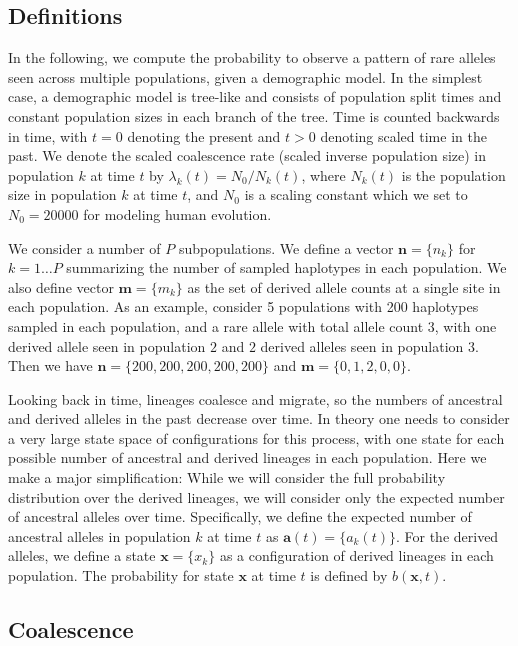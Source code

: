 \documentclass[a4paper]{article}
\begin{document}
\subsection*{Definitions}
In the following, we compute the probability to observe a pattern of rare alleles seen across multiple populations, given a demographic model. In the simplest case, a demographic model is tree-like and consists of population split times and constant population sizes in each branch of the tree. Time is counted backwards in time, with $t=0$ denoting the present and $t>0$ denoting scaled time in the past. We denote the scaled coalescence rate (scaled inverse population size) in population $k$ at time $t$ by $\lambda_k(t)=N_0/N_k(t)$, where $N_k(t)$ is the population size in population $k$ at time $t$, and $N_0$ is a scaling constant which we set to $N_0=20000$ for modeling human evolution.

We consider a number of $P$ subpopulations. We define a vector $\mathbf{n}=\{n_k\}$ for $k=1\ldots P$ summarizing the number of sampled haplotypes in each population. We also define vector $\mathbf{m}=\{m_k\}$ as the set of derived allele counts at a single site in each population. As an example, consider 5 populations with 200 haplotypes sampled in each population, and a rare allele with total allele count $3$, with one derived allele seen in population $2$ and $2$ derived alleles seen in population $3$. Then we have $\mathbf{n}=\{200,200,200,200,200\}$ and $\mathbf{m}=\{0,1,2,0,0\}$.

Looking back in time, lineages coalesce and migrate, so the numbers of ancestral and derived alleles in the past decrease over time. In theory one needs to consider a very large state space of configurations for this process, with one state for each possible number of ancestral and derived lineages in each population. Here we make a major simplification: While we will consider the full probability distribution over the derived lineages, we will consider only the expected number of ancestral alleles over time. Specifically, we define the expected number of ancestral alleles in population $k$ at time $t$ as $\mathbf{a}(t)=\{a_k(t)\}$. For the derived alleles, we define a state $\mathbf{x}=\{x_k\}$ as a configuration of derived lineages in each population. The probability for state $\mathbf{x}$ at time $t$ is defined by  $b(\mathbf{x},t)$.

\subsection*{Coalescence}
\end{document}
